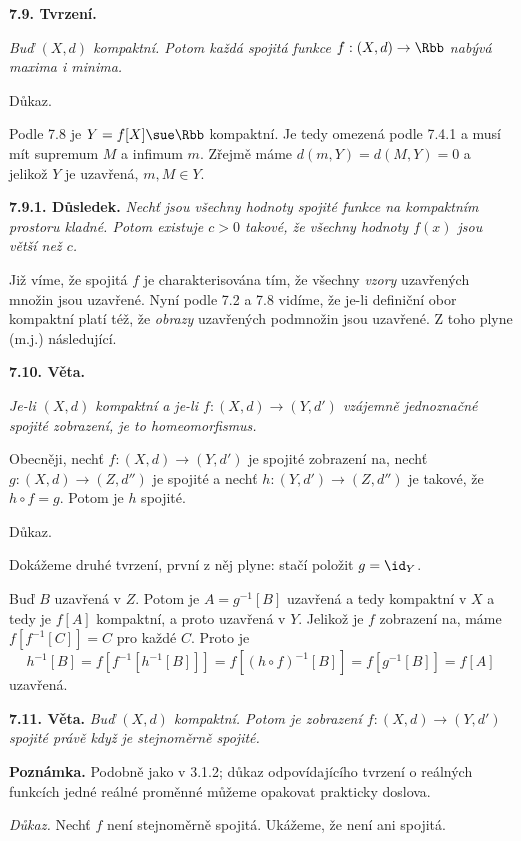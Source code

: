 \documentclass[12pt]{article}
\begin{document}
{ \bigskip
 
 {\bf 7.9. Tvrzení.} {\em Buď $(X,d)$ kompaktní. Potom každá spojitá funkce $f:(X,d)\to\Rbb$ nabývá maxima i minima. 
 
 Důkaz.} Podle 7.8 je $Y=f[X]\sue\Rbb$ kompaktní. 
  Je tedy omezená podle 7.4.1 a musí mít supremum  $M$ a infimum $m$. Zřejmě máme $d(m,Y)=d(M,Y)=0$ a jelikož $Y$ je uzavřená, $m,M\in Y$. \sq

\medskip


{\bf 7.9.1. Důsledek.} {\em Nechť jsou všechny hodnoty spojité funkce na kompaktním prostoru kladné. Potom existuje $c> 0$ takové, že všechny hodnoty $f(x)$ jsou větší než $c$.}

 
 \bigskip
 
 Již víme, že spojitá $f$ je charakterisována tím, že všechny {\em vzory} uzavřených množin jsou uzavřené. Nyní podle  7.2 a 7.8
 vidíme, že je-li definiční obor kompaktní platí též, že {\em obrazy} uzavřených podmnožin jsou uzavřené. Z toho plyne  (m.j.) následující.
 
 \medskip
 
 {\bf 7.10. Věta.} {\em Je-li $(X,d)$ kompaktní a je-li
 $f:(X,d)\to (Y,d')$ vzájemně jednoznačné spojité zobrazení, je to homeomorfismus.
 
 Obecněji, nechť
 $f:(X,d)\to (Y,d')$ je spojité zobrazení na, nechť $g:(X,d)\to (Z,d'')$ je spojité a nechť $h:(Y,d')\to (Z,d'')$ je takové, že $h\circ f=g$. Potom je $h$ spojité.
 
 Důkaz.} Dokážeme druhé tvrzení, první z něj plyne: stačí položit $g=\id_Y$.
 
 Buď $B$ uzavřená v $Z$. Potom je $A=g^{-1}[B]$ uzavřená a tedy kompaktní v $X$ a tedy je $f[A]$ kompaktní, a proto uzavřená v $Y$.
 Jelikož je $f$ zobrazení na, máme $f[f^{-1}[C]]=C$ pro každé $C$. Proto je
 $$
 h^{-1}[B]=f[f^{-1}[ h^{-1}[B]]]=f[(h\circ f)^{-1}[B]]=
 f[g^{-1}[B]]=f[A]
 $$
uzavřená. \sq
 
 
  \bigskip
 
 {\bf 7.11. Věta.} {\em Buď $(X,d)$ kompaktní. Potom je zobrazení $f:(X,d)\to (Y,d')$ spojité právě když je stejnoměrně spojité.}
 
 \smallskip
 
 {\bf Poznámka.} Podobně jako v 3.1.2; důkaz odpovídajícího tvrzení o reálných funkcích jedné reálné proměnné můžeme opakovat prakticky doslova.
 
 \smallskip
 
{\em  Důkaz.} Nechť $f$ není stejnoměrně spojitá. Ukážeme, že není ani spojitá.
 
}
\end{document}
